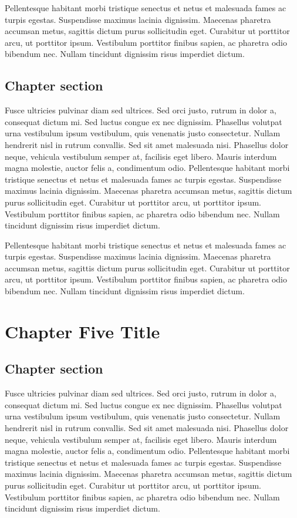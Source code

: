 Pellentesque habitant morbi tristique senectus et netus et malesuada fames ac turpis egestas. Suspendisse maximus lacinia dignissim. Maecenas pharetra accumsan metus, sagittis dictum purus sollicitudin eget. Curabitur ut porttitor arcu, ut porttitor ipsum. Vestibulum porttitor finibus sapien, ac pharetra odio bibendum nec. Nullam tincidunt dignissim risus imperdiet dictum.
\section{Chapter section}
Fusce ultricies pulvinar diam sed ultrices. Sed orci justo, rutrum in dolor a, consequat dictum mi. Sed luctus congue ex nec dignissim. Phasellus volutpat urna vestibulum ipsum vestibulum, quis venenatis justo consectetur. Nullam hendrerit nisl in rutrum convallis. Sed sit amet malesuada nisi. Phasellus dolor neque, vehicula vestibulum semper at, facilisis eget libero. Mauris interdum magna molestie, auctor felis a, condimentum odio. Pellentesque habitant morbi tristique senectus et netus et malesuada fames ac turpis egestas. Suspendisse maximus lacinia dignissim. Maecenas pharetra accumsan metus, sagittis dictum purus sollicitudin eget. Curabitur ut porttitor arcu, ut porttitor ipsum. Vestibulum porttitor finibus sapien, ac pharetra odio bibendum nec. Nullam tincidunt dignissim risus imperdiet dictum.

Pellentesque habitant morbi tristique senectus et netus et malesuada fames ac turpis egestas. Suspendisse maximus lacinia dignissim. Maecenas pharetra accumsan metus, sagittis dictum purus sollicitudin eget. Curabitur ut porttitor arcu, ut porttitor ipsum. Vestibulum porttitor finibus sapien, ac pharetra odio bibendum nec. Nullam tincidunt dignissim risus imperdiet dictum.
\chapter{Chapter Five Title}
\section{Chapter section}
Fusce ultricies pulvinar diam sed ultrices. Sed orci justo, rutrum in dolor a, consequat dictum mi. Sed luctus congue ex nec dignissim. Phasellus volutpat urna vestibulum ipsum vestibulum, quis venenatis justo consectetur. Nullam hendrerit nisl in rutrum convallis. Sed sit amet malesuada nisi. Phasellus dolor neque, vehicula vestibulum semper at, facilisis eget libero. Mauris interdum magna molestie, auctor felis a, condimentum odio. Pellentesque habitant morbi tristique senectus et netus et malesuada fames ac turpis egestas. Suspendisse maximus lacinia dignissim. Maecenas pharetra accumsan metus, sagittis dictum purus sollicitudin eget. Curabitur ut porttitor arcu, ut porttitor ipsum. Vestibulum porttitor finibus sapien, ac pharetra odio bibendum nec. Nullam tincidunt dignissim risus imperdiet dictum.

